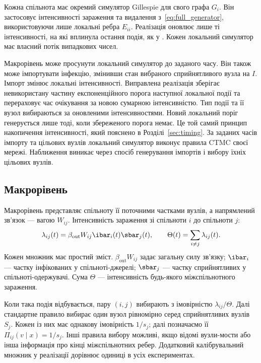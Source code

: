 Кожна спільнота має окремий симулятор Gillespie для свого графа $G_i$. Він застосовує інтенсивності зараження та видалення з~\eqref{eq:full_generator}, використовуючи лише локальні ребра $E_{ii}$. Реалізація оновлює лише ті інтенсивності, на які вплинула остання подія, як у \citet{kuryliak2025simulating}. Кожен локальний симулятор має власний потік випадкових чисел.

Макрорівень може просунути локальний симулятор до заданого часу. Він також може імпортувати інфекцію, змінивши стан вибраного сприйнятливого вузла на $I$. Імпорт змінює локальні інтенсивності. Виправлена реалізація зберігає невикористану частину експоненційного порога наступної локальної події та перераховує час очікування за новою сумарною інтенсивністю. Тип події та її вузол вибираються за оновленими інтенсивностями. Новий локальний поріг генерується лише тоді, коли збереженого порога немає. Це той самий принцип накопичення інтенсивності, який пояснено в Розділі~\ref{sec:timing}. За заданих часів імпорту та цільових вузлів локальний симулятор виконує правила CTMC своєї мережі. Наближення виникає через спосіб генерування імпортів і вибору їхніх цільових вузлів.

\subsection{Макрорівень}
\label{sec:macro}

Макрорівень представляє спільноту її поточними частками вузлів, а напрямлений зв'язок --- вагою $W_{ij}$. Інтенсивність зараження зі спільноти $i$ до спільноти $j$:
\begin{equation}
\label{eq:macro_rate}
\lambda_{ij}(t)=\beta_{\mathrm{out}}W_{ij}\ibar_i(t)\sbar_j(t),
\qquad \Theta(t)=\sum_{i\neq j}\lambda_{ij}(t).
\end{equation}
Кожен множник має простий зміст. $\beta_{\mathrm{out}}W_{ij}$ задає загальну силу зв'язку; $\ibar_i$ --- частку інфікованих у спільноті-джерелі; $\sbar_j$ --- частку сприйнятливих у спільноті-одержувачі. Сума $\Theta$ --- інтенсивність будь-якого міжспільнотного зараження.

Коли така подія відбувається, пару $(i,j)$ вибирають з імовірністю $\lambda_{ij}/\Theta$. Далі стандартне правило вибирає один вузол рівномірно серед сприйнятливих вузлів $S_j$. Кожен із них має однакову імовірність $1/s_j$; далі позначаємо її $\Pi_{ij}(v\mid x)=1/s_j$. Інші правила вибору можливі, якщо відомі вузли-мости або інша інформація про кінці міжспільнотних ребер. Додатковий калібрувальний множник у реалізації дорівнює одиниці в усіх експериментах.

